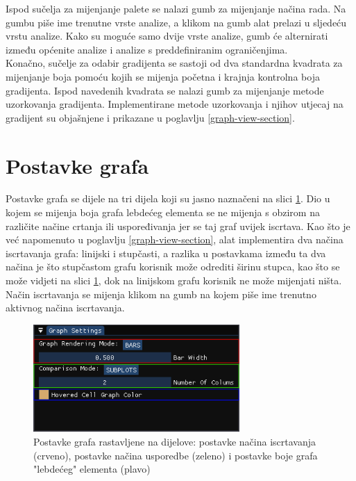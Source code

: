 \documentclass[times, utf8, diplomski]{fer}
\begin{document}
Ispod sučelja za mijenjanje palete se nalazi gumb za mijenjanje načina rada. Na gumbu piše ime trenutne vrste analize, a klikom na gumb alat prelazi u sljedeću vrstu analize. Kako su moguće samo dvije vrste analize, gumb će alternirati između općenite analize i analize s preddefiniranim ograničenjima.\\

Konačno, sučelje za odabir gradijenta se sastoji od dva standardna kvadrata za mijenjanje boja pomoću kojih se mijenja početna i krajnja kontrolna boja gradijenta. Ispod navedenih kvadrata se nalazi gumb za mijenjanje metode uzorkovanja gradijenta. Implementirane metode uzorkovanja i njihov utjecaj na gradijent su objašnjene i prikazane u poglavlju \ref{graph-view-section}.

\section{Postavke grafa} \label{graph-settings-section}

Postavke grafa se dijele na tri dijela koji su jasno naznačeni na slici \ref{fig:graph-settings-segmented}. Dio u kojem se mijenja boja grafa lebdećeg elementa se ne mijenja s obzirom na različite načine crtanja ili uspoređivanja jer se taj graf uvijek iscrtava. Kao što je već napomenuto u poglavlju \ref{graph-view-section}, alat implementira dva načina iscrtavanja grafa: linijski i stupčasti, a razlika u postavkama između ta dva načina je što stupčastom grafu korisnik može odrediti širinu stupca, kao što se može vidjeti na slici \ref{fig:graph-settings-segmented}, dok na linijskom grafu korisnik ne može mijenjati ništa. Način iscrtavanja se mijenja klikom na gumb na kojem piše ime trenutno aktivnog načina iscrtavanja.

\begin{figure} [H]
	\centering
    \includegraphics[width=0.7\textwidth]{graph_settings_subplots_segmented.png}
    \caption{Postavke grafa rastavljene na dijelove: postavke načina iscrtavanja (crveno), postavke načina usporedbe (zeleno) i postavke boje grafa "lebdećeg" elementa (plavo)}
    \label{fig:graph-settings-segmented}
\end{figure}
\end{document}

